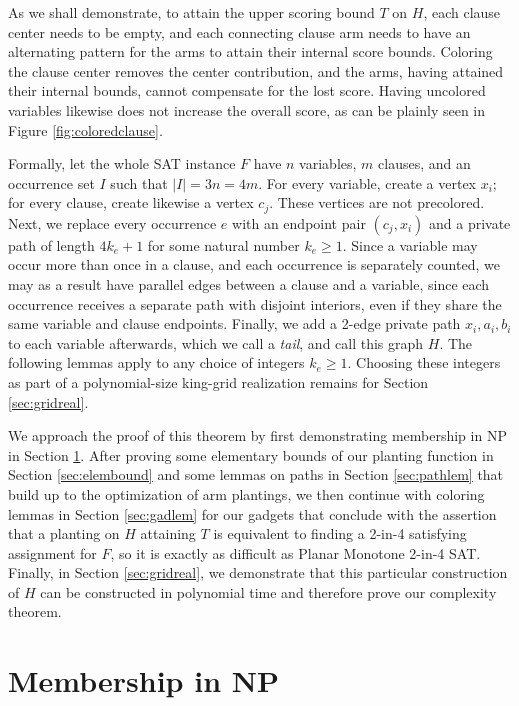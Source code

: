 \documentclass[11pt]{article}
\theoremstyle{plain}
\begin{document}
As we shall demonstrate, to attain the upper scoring bound $T$ on $H$, each clause center needs to be empty, and each connecting clause arm needs to have an alternating pattern for the arms to attain their internal score bounds. Coloring the clause center removes the center contribution, and the arms, having attained their internal bounds, cannot compensate for the lost score. Having uncolored variables likewise does not increase the overall score, as can be plainly seen in Figure \ref{fig:coloredclause}.


Formally, let the whole SAT instance $F$ have $n$ variables, $m$ clauses, and an occurrence set $I$ such that $|I| = 3n = 4m$. For every variable, create a vertex $x_i$; for every clause, create likewise a vertex $c_j$. These vertices are not precolored. Next, we replace every occurrence $e$ with an endpoint pair $(c_j, x_i)$ and a private path of length $4k_e + 1$ for some natural number $k_e \geq 1$. Since a variable may occur more than once in a clause, and each occurrence is separately counted, we may as a result have parallel edges between a clause and a variable, since each occurrence receives a separate path with disjoint interiors, even if they share the same variable and clause endpoints. Finally, we add a 2-edge private path $x_i, a_i, b_i$ to each variable afterwards, which we call a \emph{tail}, and call this graph $H$. The following lemmas apply to any choice of integers $k_e\geq 1$. Choosing these integers as part of a polynomial-size king-grid realization remains for Section \ref{sec:gridreal}.

We approach the proof of this theorem by first demonstrating membership in NP in Section \ref{sec:meminnp}. After proving some elementary bounds of our planting function in Section \ref{sec:elembound} and some lemmas on paths in Section \ref{sec:pathlem} that build up to the optimization of arm plantings, we then continue with coloring lemmas in Section \ref{sec:gadlem} for our gadgets that conclude with the assertion that a planting on $H$ attaining $T$ is equivalent to finding a 2-in-4 satisfying assignment for $F$, so it is exactly as difficult as Planar Monotone 2-in-4 SAT. Finally, in Section \ref{sec:gridreal}, we demonstrate that this particular construction of $H$ can be constructed in polynomial time and therefore prove our complexity theorem.  

\section{Membership in NP} \label{sec:meminnp}
\end{document}
